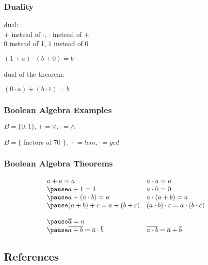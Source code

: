 \documentclass[dvipsnames]{beamer}
\begin{document}
\begin{frame}
  \frametitle{Duality}

  \begin{definition}
    \alert{dual}:\\
    $+$ instead of $\cdot$, $\cdot$ instead of $+$\\
    0 instead of 1, 1 instead of 0
  \end{definition}

  \pause
  \begin{example}
    $(1 + a) \cdot (b + 0) = b$

    dual of the theorem:

    $(0 \cdot a) + (b \cdot 1) = b$
  \end{example}
\end{frame}

\begin{frame}
  \frametitle{Boolean Algebra Examples}

  \begin{example}
    $B = \{0,1\}, + = \vee, \cdot = \wedge$
  \end{example}

  \pause
  \begin{example}
    $B = \{$ factors of $70$ $\}$, $+ = lcm, \cdot = gcd$
  \end{example}
\end{frame}

\begin{frame}
  \frametitle{Boolean Algebra Theorems}

    \[\begin{array}{ll}
      a + a = a &
      a \cdot a = a\\ \pause
      a + 1 = 1 &
      a \cdot 0 = 0\\ \pause
      a + (a \cdot b) = a &
      a \cdot (a + b) = a\\ \pause
      (a + b) + c = a + (b + c) &
      (a \cdot b) \cdot c = a \cdot (b \cdot c)\bigskip\\ \pause
      \overline{\overline{a}} = a & \\ \pause
      \overline{a + b} = \overline{a} \cdot \overline{b} &
      \overline{a \cdot b} = \overline{a} + \overline{b}
    \end{array}\]
\end{frame}

\subsection*{References}
\end{document}
